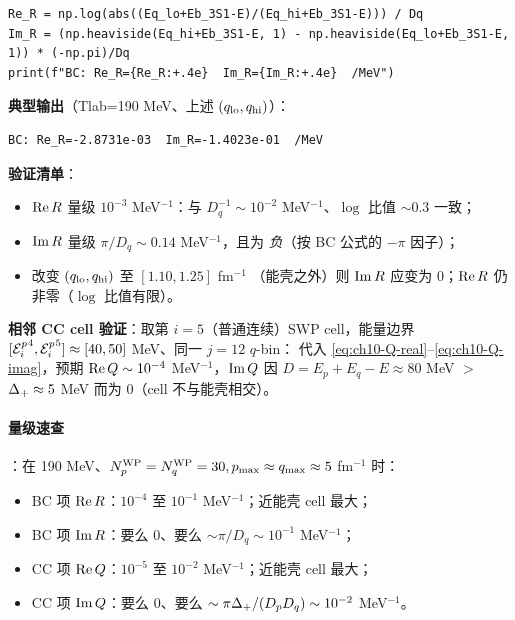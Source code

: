 \begin{numericalbox}[label=box:ch10-numerical-closure]
\begin{lstlisting}[style=python, caption={\texttt{tools/ch10\_resolvent\_demo.py}（建议放在 \texttt{tools/} 目录里；本闭环只需 30 行 NumPy）。}]
Re_R = np.log(abs((Eq_lo+Eb_3S1-E)/(Eq_hi+Eb_3S1-E))) / Dq
Im_R = (np.heaviside(Eq_hi+Eb_3S1-E, 1) - np.heaviside(Eq_lo+Eb_3S1-E, 1)) * (-np.pi)/Dq
print(f"BC: Re_R={Re_R:+.4e}  Im_R={Im_R:+.4e}  /MeV")
\end{lstlisting}

\textbf{典型输出}（Tlab=190 MeV、上述 \((q_{\rm lo}, q_{\rm hi})\)）：

\begin{lstlisting}[style=config]
BC: Re_R=-2.8731e-03  Im_R=-1.4023e-01  /MeV
\end{lstlisting}

\textbf{验证清单}：

\begin{itemize}
  \item[$\Box$] \(\operatorname{Re} R\) 量级 \(10^{-3}\) MeV\(^{-1}\)：与 \(D_q^{-1} \sim
        10^{-2}\) MeV\(^{-1}\)、\(\log\) 比值 \(\sim 0.3\) 一致；
  \item[$\Box$] \(\operatorname{Im} R\) 量级 \(\pi/D_q \sim 0.14\) MeV\(^{-1}\)，且为
        \emph{负}（按 BC 公式的 \(-\pi\) 因子）；
  \item[$\Box$] 改变 \((q_{\rm lo}, q_{\rm hi})\) 至 \([1.10, 1.25]\) fm\(^{-1}\)
        （能壳之外）则 \(\operatorname{Im} R\) 应变为 \(0\)；\(\operatorname{Re} R\) 仍非零（\(\log\) 比值有限）。
\end{itemize}

\textbf{相邻 CC cell 验证}：取第 \(i = 5\)（普通连续）SWP cell，能量边界
\([{\mathcal{E}_{i}^{p}}^{4}, {\mathcal{E}_{i}^{p}}^{5}] \approx [40, 50]\) MeV、同一 \(j = 12\) \(q\)-bin：
代入 \cref{eq:ch10-Q-real}--\cref{eq:ch10-Q-imag}，预期 \(\operatorname{Re} Q \sim 10^{-4}\)
MeV\(^{-1}\)，\(\operatorname{Im} Q\) 因 \(D = E_p + E_q - E \approx 80\) MeV \(>\) \(\Delta_{+}
\approx 5\) MeV 而为 \(0\)（cell 不与能壳相交）。
\end{numericalbox}

\paragraph{量级速查}：在 190 MeV、\({N_{p}^{\text{WP}}} = {N_{q}^{\text{WP}}} = 30, p_{\max} \approx q_{\max}
\approx 5\) fm\(^{-1}\) 时：

\begin{itemize}
  \item BC 项 \(\operatorname{Re} R\)：\(10^{-4}\) 至 \(10^{-1}\) MeV\(^{-1}\)；近能壳 cell
        最大；
  \item BC 项 \(\operatorname{Im} R\)：要么 \(0\)、要么 \(\sim \pi/D_q \sim 10^{-1}\) MeV\(^{-1}\)；
  \item CC 项 \(\operatorname{Re} Q\)：\(10^{-5}\) 至 \(10^{-2}\) MeV\(^{-1}\)；近能壳 cell 最大；
  \item CC 项 \(\operatorname{Im} Q\)：要么 \(0\)、要么 \(\sim \pi \Delta_{+} / (D_p D_q) \sim
        10^{-2}\) MeV\(^{-1}\)。
\end{itemize}

